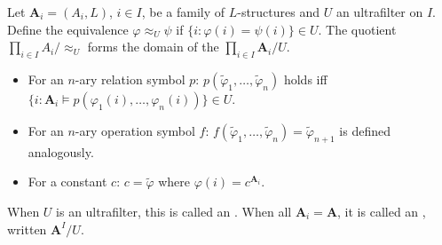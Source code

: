 Let $\mathbf{A}_i = (A_i, L)$, $i \in I$, be a family of $L$-structures and $U$ an ultrafilter on $I$. Define the equivalence $\varphi \approx_U \psi$ if $\{i : \varphi(i) = \psi(i)\} \in U$. The quotient $\prod_{i \in I} A_i / \approx_U$ forms the domain of the  $\prod_{i \in I} \mathbf{A}_i / U$.
\begin{itemize}
\item For an $n$-ary relation symbol $p$: $p(\tilde{\varphi}_1, \ldots, \tilde{\varphi}_n)$ holds iff $\{i : \mathbf{A}_i \vDash p(\varphi_1(i), \ldots, \varphi_n(i))\} \in U$.
\item For an $n$-ary operation symbol $f$: $f(\tilde{\varphi}_1, \ldots, \tilde{\varphi}_n) = \tilde{\varphi}_{n+1}$ is defined analogously.
\item For a constant $c$: $c = \tilde{\varphi}$ where $\varphi(i) = c^{\mathbf{A}_i}$.
\end{itemize}
When $U$ is an ultrafilter, this is called an . When all $\mathbf{A}_i = \mathbf{A}$, it is called an , written $\mathbf{A}^I / U$.
